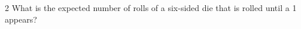 \documentclass[a4paper,12pt]{book}
\newcounter{question}
\begin{document}
        \newpage
        \begin{question}{\thequestion}{2}
            What is the expected number of rolls of a six-sided die
            that is rolled until a 1 appears?

        \end{question}

        \hrulefill
\end{document}
